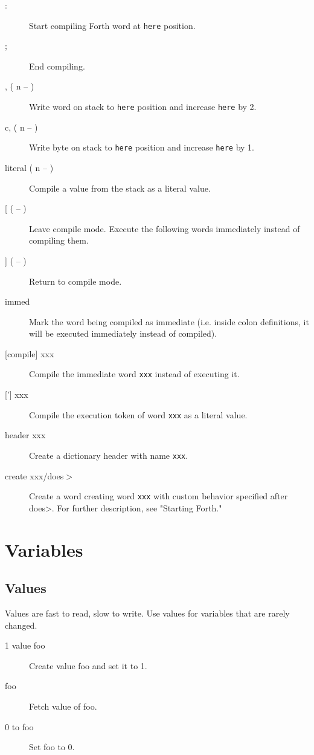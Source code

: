 \begin{description}
\item[:] Start compiling Forth word at \texttt{here} position.
\item[;] End compiling.
\item[, ( n -- )] Write word on stack to \texttt{here} position and increase \texttt{here} by 2.
\item[c, ( n -- )] Write byte on stack to \texttt{here} position and increase \texttt{here} by 1.
\item[literal ( n -- )] Compile a value from the stack as a literal value.
\item[[ ( -- )] Leave compile mode. Execute the following words immediately instead of compiling them.
\item[{]} ( -- )] Return to compile mode.
\item[immed] Mark the word being compiled as immediate (i.e. inside colon definitions, it will be executed immediately instead of compiled).
\item[[compile{]} xxx] Compile the immediate word \texttt{xxx} instead of executing it.
\item[{[']} xxx] Compile the execution token of word \texttt{xxx} as a literal value.
\item[header xxx] Create a dictionary header with name \texttt{xxx}. 
\item[create xxx/does$>$] Create a word creating word \texttt{xxx} with custom behavior
specified after does>. For further description, see "Starting Forth."

\end{description}

\section{Variables}

\subsection{Values}

Values are fast to read, slow to write. Use values for variables
that are rarely changed. 

\begin{description}
\item[1 value foo] Create value foo and set it to 1.
\item[foo] Fetch value of foo.
\item[0 to foo] Set foo to 0.
\end{description}

